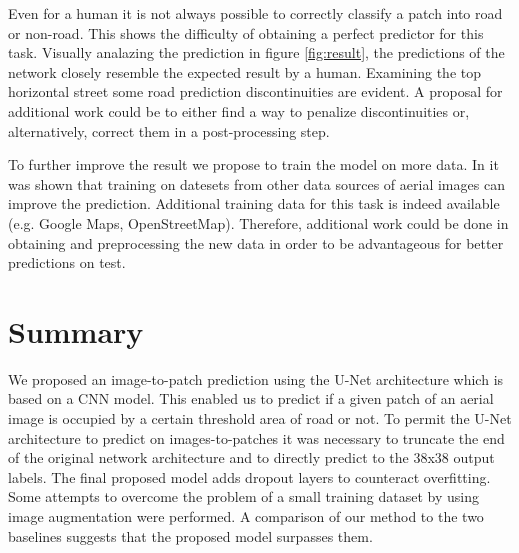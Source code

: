 \documentclass[10pt,conference,compsocconf]{IEEEtran}
\begin{document}
Even for a human it is not always possible to correctly classify a patch into road or non-road. This shows the difficulty of obtaining a perfect predictor for this task. Visually analazing the prediction in figure \ref{fig:result}, the predictions of the network closely resemble the expected result by a human. Examining the top horizontal street some road prediction discontinuities are evident. A proposal for additional work could be to either find a way to penalize discontinuities or, alternatively, correct them in a post-processing step.

To further improve the result we propose to train the model on more data. In \cite{Kaiser2017} it was shown that training on datesets from other data sources of aerial images can improve the prediction. Additional training data for this task is indeed available (e.g. Google Maps, OpenStreetMap). Therefore, additional work could be done in obtaining and preprocessing the new data in order to be advantageous for better predictions on test.

\section{Summary}

We proposed an image-to-patch prediction using the U-Net architecture which is based on a CNN model. This enabled us to predict if a given patch of an aerial image is occupied by a certain threshold area of road or not. To permit the U-Net architecture to predict on images-to-patches it was necessary to truncate the end of the original network architecture and to directly predict to the 38x38 output labels. The final proposed model adds dropout layers to counteract overfitting. Some attempts to overcome the problem of a small training dataset by using image augmentation were performed. A comparison of our method to the two baselines suggests that the proposed model surpasses them.






\end{document}
